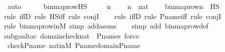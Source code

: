 \begin{isabellebody}
\ auto\isanewline
{}\isamarkupfalse%
%
\endisatagproof
{\isafoldproof}%
%
\isadelimproof
\isanewline
%
\endisadelimproof
\ \ \ \ \isanewline
{}\isamarkupfalse%
\ binmap{\isacharunderscore}{\kern0pt}row{\isacharprime}{\kern0pt}{\isacharunderscore}{\kern0pt}HS\ {\isacharcolon}{\kern0pt}\ \isanewline
\ \ \ n\ \isanewline
\ \ \ {\isachardoublequoteopen}n\ {\isasymin}\ nat{\isachardoublequoteclose}\ \isanewline
\ \ \ {\isachardoublequoteopen}binmap{\isacharunderscore}{\kern0pt}row{\isacharprime}{\kern0pt}{\isacharparenleft}{\kern0pt}n{\isacharparenright}{\kern0pt}\ {\isasymin}\ HS{\isachardoublequoteclose}\ \isanewline
%
\isadelimproof
\ \ %
\endisadelimproof
%
\isatagproof
{}\isamarkupfalse%
{\isacharparenleft}{\kern0pt}rule\ iffD{}{\isacharcomma}{\kern0pt}\ rule\ HS{\isacharunderscore}{\kern0pt}iff{\isacharcomma}{\kern0pt}\ rule\ conjI{\isacharparenright}{\kern0pt}\isanewline
\ \ \ \isamarkupfalse%
{\isacharparenleft}{\kern0pt}rule\ iffD{}{\isacharcomma}{\kern0pt}\ rule\ P{\isacharunderscore}{\kern0pt}name{\isacharunderscore}{\kern0pt}iff{\isacharcomma}{\kern0pt}\ rule\ conjI{\isacharparenright}{\kern0pt}\isanewline
\ \ \ \ \isamarkupfalse%
{\isacharparenleft}{\kern0pt}rule\ binmap{\isacharunderscore}{\kern0pt}row{\isacharprime}{\kern0pt}{\isacharunderscore}{\kern0pt}in{\isacharunderscore}{\kern0pt}M{\isacharcomma}{\kern0pt}\ simp\ add{\isacharcolon}{\kern0pt}assms{\isacharparenright}{\kern0pt}\isanewline
\ \ \ \isamarkupfalse%
{\isacharparenleft}{\kern0pt}simp\ add{\isacharcolon}{\kern0pt}\ binmap{\isacharunderscore}{\kern0pt}row{\isacharprime}{\kern0pt}{\isacharunderscore}{\kern0pt}def{\isacharparenright}{\kern0pt}\isanewline
\ \ \ \isamarkupfalse%
{\isacharparenleft}{\kern0pt}subgoal{\isacharunderscore}{\kern0pt}tac\ {\isachardoublequoteopen}domain{\isacharparenleft}{\kern0pt}check{\isacharparenleft}{\kern0pt}nat{\isacharparenright}{\kern0pt}{\isacharparenright}{\kern0pt}\ {\isasymsubseteq}\ P{\isacharunderscore}{\kern0pt}names{\isachardoublequoteclose}{\isacharcomma}{\kern0pt}\ force{\isacharparenright}{\kern0pt}\isanewline
\ \ \isamarkupfalse%
\ check{\isacharunderscore}{\kern0pt}P{\isacharunderscore}{\kern0pt}name\ nat{\isacharunderscore}{\kern0pt}in{\isacharunderscore}{\kern0pt}M\ P{\isacharunderscore}{\kern0pt}name{\isacharunderscore}{\kern0pt}domain{\isacharunderscore}{\kern0pt}P{\isacharunderscore}{\kern0pt}name{\isacharprime}{\kern0pt}\isanewline

\end{isabellebody}
